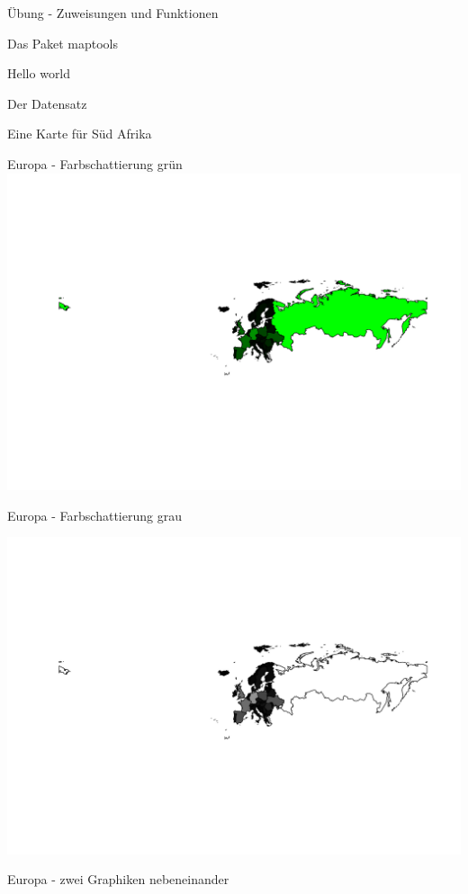 \documentclass[ignorenonframetext,]{beamer}
\begin{document}
\begin{frame}[fragile]{Übung - Zuweisungen und Funktionen}
\begin{frame}[fragile]{Das Paket maptools}
\begin{frame}[fragile]{Hello world}
\begin{frame}[fragile]{Der Datensatz}
\begin{frame}[fragile]{Eine Karte für Süd Afrika}
\begin{frame}{Europa - Farbschattierung grün}
\includegraphics{Geomedizin_files/figure-beamer/unnamed-chunk-102-1.pdf}

\end{frame}

\begin{frame}{Europa - Farbschattierung grau}

\includegraphics{Geomedizin_files/figure-beamer/unnamed-chunk-103-1.pdf}

\end{frame}

\begin{frame}{Europa - zwei Graphiken nebeneinander}


\end{frame}
\end{frame}
\end{frame}
\end{frame}
\end{frame}
\end{frame}
\end{document}
